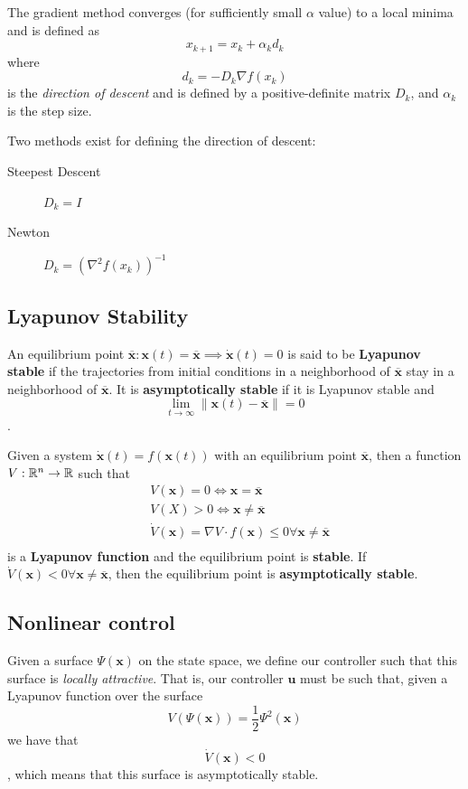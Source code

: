 \documentclass[a4paper]{report}
\begin{document}
The gradient method converges (for sufficiently small $\alpha$ value) to a local minima and is defined as \[
x_{k+1} = x_k + \alpha_kd_k
\] where \[
d_k = -D_k\nabla f\left( x_k \right) 
\] is the \emph{direction of descent} and is defined by a positive-definite matrix $D_k$, and $\alpha_k$ is the step size.

Two methods exist for defining the direction of descent:
\begin{description}
    \item[Steepest Descent] $D_k = I$
    \item[Newton] $D_k = \left( \nabla ^{2}f\left( x_k \right)  \right) ^{-1}$
\end{description}

\subsection*{Lyapunov Stability}

An equilibrium point $\bm{\overline{x}} : \bm{x}(t)=\bm{\overline{x}}\implies\bm{\dot{x}}(t) = 0$ is said to be \textbf{Lyapunov stable} if the trajectories from initial conditions in a neighborhood of $\bm{\overline{x}}$ stay in a neighborhood of $\bm{\overline{x}}$. It is \textbf{asymptotically stable} if it is Lyapunov stable and \[
\lim_{t \to \infty} \|\bm{x}(t)-\bm{\overline{x}}\|=0
\].

Given a system $\bm{\dot{x}}(t) = f\left( \bm{x}(t) \right) $ with an equilibrium point $\bm{\overline{x}}$, then a function $V:\mathbb{R}^{n}\to \mathbb{R}$ such that
\begin{align*}
    &V(\bm{x}) = 0 \iff \bm{x} = \bm{\overline{x}} \\
    &V(X) > 0 \iff \bm{x} \neq \bm{\overline{x}} \\
    &\dot{V}(\bm{x}) = \nabla V \cdot f(\bm{x}) \le 0 \forall \bm{x}\neq \bm{\overline{x}} \\
\end{align*}
is a \textbf{Lyapunov function} and the equilibrium point is \textbf{stable}. If $\dot{V}(\bm{x}) <0 \forall \bm{x}\neq \bm{\overline{x}}$, then the equilibrium point is \textbf{asymptotically stable}.

\subsection*{Nonlinear control}

Given a surface $\Psi(\bm{x})$ on the state space, we define our controller such that this surface is \emph{locally attractive}. That is, our controller $\bm{u}$ must be such that, given a Lyapunov function over the surface \[
    V(\Psi(\bm{x})) = \frac{1}{2}\Psi^2(\bm{x})
\] we have that \[
\dot{V}(\bm{x}) < 0
\], which means that this surface is asymptotically stable.
\end{document}
